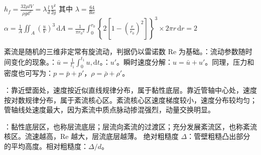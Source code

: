 $h_f = \frac{32\mu l V}{\rho g d^2}=\lambda \frac{l}{d}\frac{V^2}{2g}$ 其中 $\lambda = \frac{64}{\mathrm{Re}}$\\

$\alpha = \frac{1}{A}\iint_A\left(\frac{u}{V}\right)^3\,\mathrm{d}A=\frac{1}{\pi {r_0}^2}\int_{0}^{r_0} \left\{2\left[1-\left(\frac{r}{r_0}\right)^2\right]\right\}^3\times 2\pi r \, \mathrm{d}r = 2$

\divider


紊流是随机的三维非定常有旋流动，判据仍以雷诺数 $\mathrm{Re}$ 为基础。：流动参数随时间变化的现象。：$\bar{u}=\frac{1}{t_1}\int_0^{t_1}u,\mathrm{d}t$。：$u'$。瞬时速度分解：$u=\bar{u}+u'$。同理，压力和密度也可写为：$p=\bar{p}+p'$，$\rho=\bar{\rho}+\rho'$。

：靠近壁面处，速度按近似直线规律分布，属于黏性底层。靠近管轴中心处，速度按对数规律分布，属于紊流核心区。紊流核心区速度梯度较小，速度分布较均匀；管轴线处速度最大，因为紊流中质点脉动掺混强烈，动量交换明显。

\par\vspace{0.5pt}
{\centering
    \renewcommand{\arraystretch}{1.6}
    \par}

：黏性底层区，也称层流底层；层流向紊流的过渡区；充分发展紊流区，也称紊流核区。流速越高，$\mathrm{Re}$ 越大，层流底层越薄。
绝对粗糙度 $\Delta$：管壁粗糙凸出部分的平均高度。相对粗糙度：$\Delta/d$。

